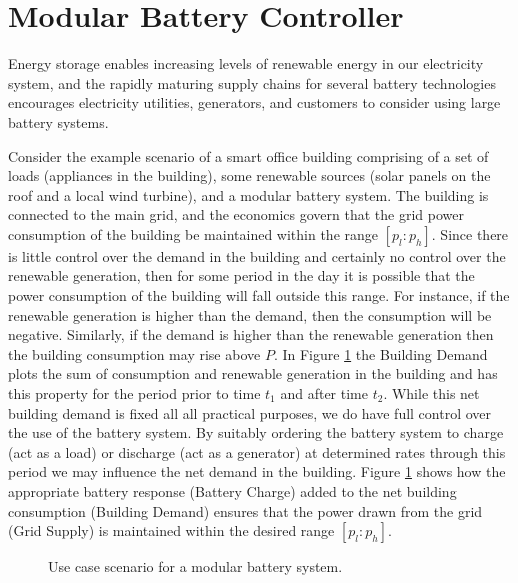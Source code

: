 \section{Modular Battery Controller}\label{sec:introduction}

Energy storage enables increasing levels of renewable energy in our electricity system, and the rapidly maturing supply chains for several battery technologies encourages electricity utilities, generators, and customers to consider using large battery systems. 

Consider the example scenario of a smart office building comprising of a set of loads (appliances in the building), some renewable sources (solar panels on the roof and a local wind turbine), and a modular battery system. The building is connected to the main grid, and the economics govern that the grid power consumption of the building be maintained within the range $[p_l:p_h]$. Since there is little control over the demand in the building and certainly no control over the renewable generation, then for some period in the day it is possible that the power consumption of the building will fall outside this range. For instance, if the renewable generation is higher than the demand, then the consumption will be negative. Similarly, if the demand is higher than the renewable generation then the building consumption may rise above $P$. In Figure \ref{fig:usecase} the Building Demand plots the sum of consumption and renewable generation in the building and has this property for the period prior to time $t_1$ and after time $t_2$. While this net building demand is fixed all all practical purposes, we do have full control over the use of the battery system. By suitably ordering the battery system to charge (act as a load) or discharge (act as a generator) at determined rates through this period we may influence the net demand in the building. Figure \ref{fig:usecase} shows how the appropriate battery response (Battery Charge) added to the net building consumption (Building Demand) ensures that the power drawn from the grid (Grid Supply) is maintained within the desired range $[p_l:p_h]$.

\begin{figure}[ht]
\begin{center}

\end{center}
\caption{Use case scenario for a modular battery system.}
\label{fig:usecase}
\end{figure}

